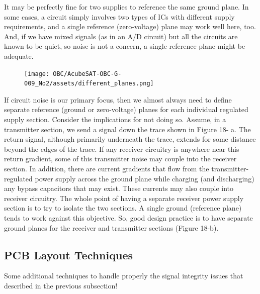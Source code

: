 \documentclass[final]{cubedoc}
\begin{document}
	It may be perfectly fine for two supplies to reference the same ground plane. In some cases, a circuit simply involves two types of ICs with different supply requirements, and a single reference (zero-voltage) plane may work well here, too. And, if we have mixed signals (as in an A/D circuit) but all the circuits are known to be quiet, so noise is not a concern, a single reference plane might be adequate. 
	
	\begin{figure}[h!]
		\centering
		\texttt{[image: OBC/AcubeSAT-OBC-G-009\_No2/assets/different\_planes.png]}
		\caption{}
		\label{fig:my_label}
	\end{figure}
	
	If circuit noise is our primary focus, then we almost always need to define separate reference (ground or zero-voltage) planes for each individual regulated supply section. Consider the implications for not doing so. Assume, in a transmitter section, we send a signal down the trace shown in Figure 18- a. The return signal, although primarily underneath the trace, extends for
	some distance beyond the edges of the trace. If any receiver circuitry is anywhere near this return gradient, some of this transmitter noise may couple
	into the receiver section. In addition, there are current gradients that flow
	from the transmitter-regulated power supply across the ground plane while charging (and discharging) any bypass capacitors that may exist. These
	currents may also couple into receiver circuitry. The whole point of having a
	separate receiver power supply section is to try to isolate the two sections. A single ground (reference plane) tends to work against this objective. So, good design practice is to have separate ground planes for the receiver and
	transmitter sections (Figure 18-b).
	
	
	\subsection{PCB Layout Techniques}
	\label{subsec:techniques}
	
	Some additional techniques to handle properly the signal integrity issues that described in the previous subsection!
\end{document}
